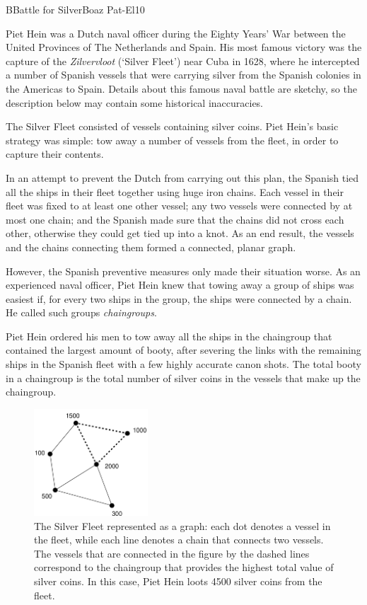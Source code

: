 \begin{icpcproblem}{B}{Battle for Silver}{Boaz Pat-El}{10}

Piet Hein was a Dutch naval officer during the Eighty Years' War between the United Provinces of The Netherlands and Spain.
His most famous victory was the capture of the \emph{Zilvervloot} (`Silver Fleet') near Cuba in 1628, where he intercepted
a number of Spanish vessels that were carrying silver from the Spanish colonies in the Americas to Spain.
Details about this famous naval battle are sketchy, so the description below may contain some historical inaccuracies.

The Silver Fleet consisted of vessels containing silver coins. Piet Hein's basic strategy was simple:
  tow away a number of vessels from the fleet, in order to capture their contents.

In an attempt to prevent the Dutch from carrying out this plan, the Spanish tied all the ships in their fleet together
using huge iron chains. Each vessel in their fleet was fixed to at least one other vessel; any two vessels
were connected by at most one chain; and the Spanish made sure that the chains did not cross each other, otherwise they
could get tied up into a knot. As an end result, the vessels and the chains connecting them formed a connected, planar graph.

However, the Spanish preventive measures only made their situation worse. As an experienced naval officer, Piet Hein knew that
towing away a group of ships was easiest if, for every two ships in the group, the ships were connected by a chain. He called
such groups \emph{chaingroups}.

Piet Hein ordered his men to tow away all the ships in the chaingroup that contained the largest amount of booty,
after severing the links with the remaining ships in the Spanish fleet with a few highly accurate canon shots.
The total booty in a chaingroup is the total number of silver coins in the vessels that make up the chaingroup.


\begin{figure}[h]
\centering
\includegraphics[width=0.38\textwidth]{piethein-diagram-dashed.pdf}
\caption{The Silver Fleet represented as a graph: each dot denotes a vessel in the fleet, while each line denotes a chain that connects two vessels.
         The vessels that are connected in the figure by the dashed lines correspond to the chaingroup that provides the highest total value of silver coins.
         In this case, Piet Hein loots 4500 silver coins from the fleet.}
\end{figure}


\end{icpcproblem}

